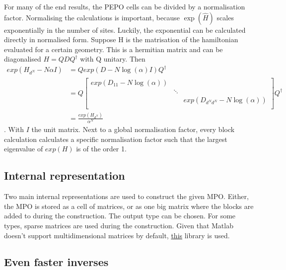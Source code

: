 For many of the end results, the PEPO cells can be divided by a normalisation factor. Normalising the calculations is important, because $\exp( \hat{H})$ scales exponentially in the number of sites. Luckily, the exponential can be calculated directly in normalised form. Suppose H is the matrisation of the hamiltonian evaluated for a certain geometry. This is a hermitian matrix and can be diagonalised $H= Q D Q^{\dagger}$ with Q unitary. Then
\begin{align}
    exp(  H_{d^N} - N \alpha I  ) & =  Q exp(  D- N \log(\alpha ) I    ) Q^{\dagger} \\
                                  & =  Q \begin{bmatrix} exp(D_{1 1} - N \log(\alpha )) &        &                                     \\
                                               & \ddots &                                     \\
                                               &        & exp(D_{ d^N d^N} - N \log(\alpha )) \\
    \end{bmatrix}  Q^{\dagger}      \\
                                  & = \frac{  exp(  H_{d^N} ) }{ \alpha^N }
\end{align}.
With $I$ the unit matrix. Next to a global normalisation factor, every block calculation calculates a specific normalisation factor such that the largest eigenvalue of $exp(H)$ is of the order 1.

\subsection{Internal representation}

Two main internal representations are used to construct the given MPO. Either, the MPO is stored as a cell of matrices, or as one big matrix where the blocks are added to during the construction. The output type can be chosen. For some types, sparse matrices are used during the construction. Given that Matlab doesn't support multidimensional matrices by default, \href{https://nl.mathworks.com/matlabcentral/fileexchange/29832-n-dimensional-sparse-arrays}{this}\cite{Matt} library is used.

\subsection{Even faster inverses}

